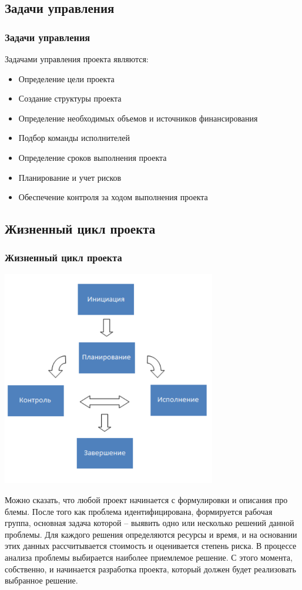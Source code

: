 \documentclass{../industrial-development}
\begin{document}
\subsection{Задачи управления}
\begin{frame} \frametitle{Задачи управления}
	Задачами управления проекта являются:
	\begin{itemize}
	\item Определение цели проекта
	\item Создание структуры проекта
	\item Определение необходимых объемов и источников финансирования
	\item Подбор команды исполнителей
	\item Определение сроков выполнения проекта
	\item Планирование и учет рисков
	\item Обеспечение контроля за ходом выполнения проекта
	\end{itemize}
\end{frame}

\subsection{Жизненный цикл проекта}

\begin{frame} \frametitle{Жизненный цикл проекта}
	\centerline{\includegraphics[width=0.7\textwidth]{manageproject.pdf}}
\end{frame}
\lecturenotes
Можно сказать, что любой проект начинается с формулировки и описания про
блемы. После того как проблема идентифицирована, формируется рабочая группа, основная задача которой – выявить одно или несколько решений данной проблемы. Для каждого решения определяются ресурсы и время, и на основании этих данных рассчитывается стоимость и оценивается степень риска. В процессе анализа проблемы выбирается наиболее приемлемое решение. С этого момента, собственно, и начинается разработка проекта, который должен будет реализовать выбранное решение.
\end{document}
